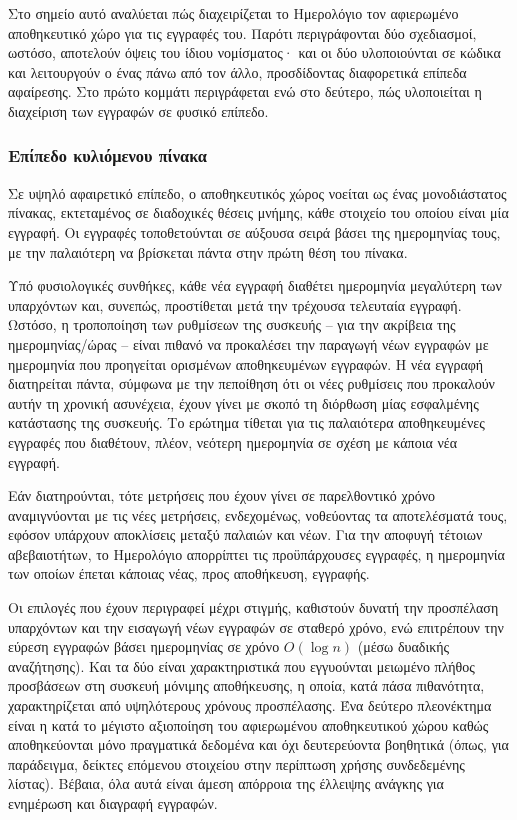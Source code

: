 Στο σημείο αυτό αναλύεται πώς διαχειρίζεται το Ημερολόγιο τον αφιερωμένο
αποθηκευτικό χώρο για τις εγγραφές του. Παρότι περιγράφονται δύο σχεδιασμοί,
ωστόσο, αποτελούν όψεις του ίδιου νομίσματος· και οι δύο υλοποιούνται σε κώδικα
και λειτουργούν ο ένας πάνω από τον άλλο, προσδίδοντας διαφορετικά επίπεδα
αφαίρεσης. Στο πρώτο κομμάτι περιγράφεται  ενώ στο δεύτερο, πώς υλοποιείται η
διαχείριση των εγγραφών σε φυσικό επίπεδο.

\subsubsection{Επίπεδο κυλιόμενου πίνακα}
\label{ssubsec:log:linear}

Σε υψηλό αφαιρετικό επίπεδο, ο αποθηκευτικός χώρος νοείται ως ένας μονοδιάστατος
πίνακας, εκτεταμένος σε διαδοχικές θέσεις μνήμης, κάθε στοιχείο του οποίου είναι
μία εγγραφή. Οι εγγραφές τοποθετούνται σε αύξουσα σειρά βάσει της ημερομηνίας
τους, με την παλαιότερη να βρίσκεται πάντα στην πρώτη θέση του πίνακα.

Υπό φυσιολογικές συνθήκες, κάθε νέα εγγραφή διαθέτει ημερομηνία μεγαλύτερη των
υπαρχόντων και, συνεπώς, προστίθεται μετά την τρέχουσα τελευταία εγγραφή.
Ωστόσο, η τροποποίηση των ρυθμίσεων της συσκευής -- για την ακρίβεια της
ημερομηνίας\slash ώρας --  είναι πιθανό να προκαλέσει την παραγωγή νέων εγγραφών
με ημερομηνία που προηγείται ορισμένων αποθηκευμένων εγγραφών. Η νέα εγγραφή
διατηρείται πάντα, σύμφωνα με την πεποίθηση ότι οι νέες ρυθμίσεις που προκαλούν
αυτήν τη χρονική ασυνέχεια, έχουν γίνει με σκοπό τη διόρθωση μίας εσφαλμένης
κατάστασης της συσκευής. Το ερώτημα τίθεται για τις παλαιότερα αποθηκευμένες
εγγραφές που διαθέτουν, πλέον, νεότερη ημερομηνία σε σχέση με κάποια νέα
εγγραφή.

Εάν διατηρούνται, τότε μετρήσεις που έχουν γίνει σε παρελθοντικό χρόνο
αναμιγνύονται με τις νέες μετρήσεις, ενδεχομένως, νοθεύοντας τα αποτελέσματά
τους, εφόσον υπάρχουν αποκλίσεις μεταξύ παλαιών και νέων. Για την αποφυγή
τέτοιων αβεβαιοτήτων, το Ημερολόγιο απορρίπτει τις προϋπάρχουσες εγγραφές, η
ημερομηνία των οποίων έπεται κάποιας νέας, προς αποθήκευση, εγγραφής.

Οι επιλογές που έχουν περιγραφεί μέχρι στιγμής, καθιστούν δυνατή την προσπέλαση
υπαρχόντων και την εισαγωγή νέων εγγραφών σε σταθερό χρόνο, ενώ επιτρέπουν την
εύρεση εγγραφών βάσει ημερομηνίας σε χρόνο $O(\log n)$ (μέσω δυαδικής
αναζήτησης). Και τα δύο είναι χαρακτηριστικά που εγγυούνται μειωμένο πλήθος
προσβάσεων στη συσκευή μόνιμης αποθήκευσης, η οποία, κατά πάσα πιθανότητα,
χαρακτηρίζεται από υψηλότερους χρόνους προσπέλασης. Ένα δεύτερο πλεονέκτημα
είναι η κατά το μέγιστο αξιοποίηση του αφιερωμένου αποθηκευτικού χώρου καθώς
αποθηκεύονται μόνο πραγματικά δεδομένα και όχι δευτερεύοντα βοηθητικά (όπως, για
παράδειγμα, δείκτες επόμενου στοιχείου στην περίπτωση χρήσης συνδεδεμένης
λίστας).
Βέβαια, όλα αυτά είναι άμεση απόρροια της
έλλειψης ανάγκης για ενημέρωση και διαγραφή εγγραφών.


